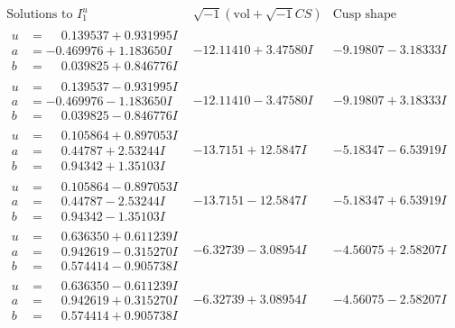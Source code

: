 \documentclass[1p]{elsarticle_modified}
\theoremstyle{definition}
\newcommand{\I}{\sqrt{-1}}
\begin{document}
$$\begin{array}{c|c|c}  
\text{Solutions to }I^u_{1}& \I (\text{vol} + \sqrt{-1}CS) & \text{Cusp shape}\\
 \hline 
\begin{aligned}
u &= \phantom{-}0.139537 + 0.931995 I \\
a &= -0.469976 + 1.183650 I \\
b &= \phantom{-}0.039825 + 0.846776 I\end{aligned}
 & -12.11410 + 3.47580 I & -9.19807 - 3.18333 I \\ \hline\begin{aligned}
u &= \phantom{-}0.139537 - 0.931995 I \\
a &= -0.469976 - 1.183650 I \\
b &= \phantom{-}0.039825 - 0.846776 I\end{aligned}
 & -12.11410 - 3.47580 I & -9.19807 + 3.18333 I \\ \hline\begin{aligned}
u &= \phantom{-}0.105864 + 0.897053 I \\
a &= \phantom{-}0.44787 + 2.53244 I \\
b &= \phantom{-}0.94342 + 1.35103 I\end{aligned}
 & -13.7151 + 12.5847 I & -5.18347 - 6.53919 I \\ \hline\begin{aligned}
u &= \phantom{-}0.105864 - 0.897053 I \\
a &= \phantom{-}0.44787 - 2.53244 I \\
b &= \phantom{-}0.94342 - 1.35103 I\end{aligned}
 & -13.7151 - 12.5847 I & -5.18347 + 6.53919 I \\ \hline\begin{aligned}
u &= \phantom{-}0.636350 + 0.611239 I \\
a &= \phantom{-}0.942619 - 0.315270 I \\
b &= \phantom{-}0.574414 - 0.905738 I\end{aligned}
 & -6.32739 - 3.08954 I & -4.56075 + 2.58207 I \\ \hline\begin{aligned}
u &= \phantom{-}0.636350 - 0.611239 I \\
a &= \phantom{-}0.942619 + 0.315270 I \\
b &= \phantom{-}0.574414 + 0.905738 I\end{aligned}
 & -6.32739 + 3.08954 I & -4.56075 - 2.58207 I \\ \hline\begin{aligned}

\end{aligned}
\end{array}$$
\end{document}
